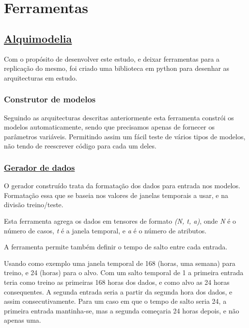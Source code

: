 \chapter{Ferramentas}

\section{\href{https://github.com/alquimodelia/alquimodelia}{Alquimodelia}\label{se:alquimodelia}}


Com o propósito de desenvolver este estudo, e deixar ferramentas para a replicação do mesmo, foi criado uma biblioteca em python para desenhar as arquitecturas em estudo.\par

\subsection{Construtor de modelos}

Seguindo as arquitecturas descritas anteriormente esta ferramenta constrói os modelos automaticamente, sendo que precisamos apenas de fornecer os parâmetros variáveis. Permitindo assim um fácil teste de vários tipos de modelos, não tendo de reescrever código para cada um deles.\par

\subsection{\href{https://github.com/alquimodelia/alquitable/blob/main/alquitable/generator.py}{Gerador de dados}}

O gerador construído trata da formatação dos dados para entrada nos modelos. Formatação essa que se baseia nos valores de janelas temporais a usar, e na divisão treino/teste.\par
Esta ferramenta agrega os dados em tensores de formato \textit{(N, t, a)}, onde \textit{N} é o número de casos, \textit{t} é a janela temporal, e \textit{a} é o número de atributos.\par
A ferramenta permite também definir o tempo de salto entre cada entrada.\par
Usando como exemplo uma janela temporal de 168 (horas, uma semana) para treino, e 24 (horas) para o alvo. Com um salto temporal de 1 a primeira entrada teria como treino as primeiras 168 horas dos dados, e como alvo as 24 horas consequentes. A segunda entrada seria a partir da segunda hora dos dados, e assim consecutivamente. Para um caso em que o tempo de salto seria 24, a primeira entrada mantinha-se, mas a segunda começaria 24 horas depois, e não apenas uma.\par

